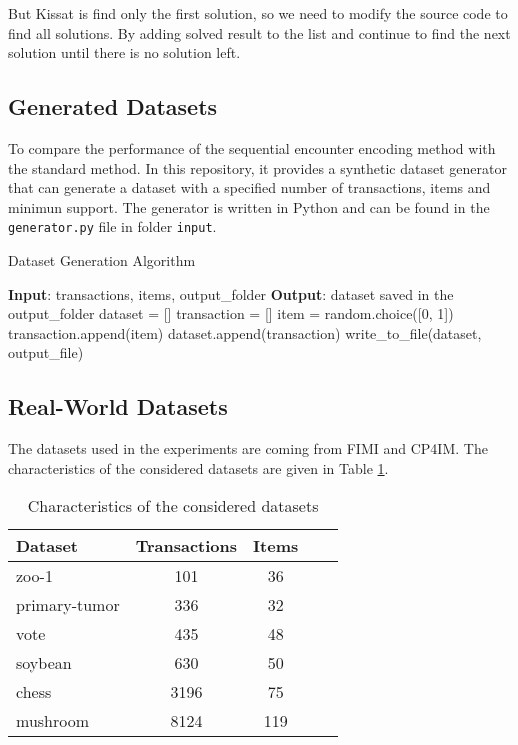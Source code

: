 But Kissat is find only the first solution, so we need to modify the source code to find all solutions.
By adding solved result to the list and continue to find the next solution until there is no solution left.

\subsection{Generated Datasets}
To compare the performance of the sequential encounter encoding method with the standard method.
In this repository, it provides a synthetic dataset generator that can generate a dataset with a specified number of transactions, items and minimun support.
The generator is written in Python and can be found in the \texttt{generator.py} file in folder \texttt{input}.

\begin{algorithm}
    \caption{Dataset Generation Algorithm}
    \begin{algorithmic}[1]
        \State \textbf{Input}: transactions, items, output\_folder
        \State \textbf{Output}: dataset saved in the output\_folder
        \State dataset = []
        \State transaction = []
        \State item = random.choice([0, 1])
        \State transaction.append(item)
        \EndFor
        \State dataset.append(transaction)
        \EndFor
        \State write\_to\_file(dataset, output\_file)
    \end{algorithmic}
\end{algorithm}

\subsection{Real-World Datasets}
The datasets used in the experiments are coming from FIMI\cite{fimi} and CP4IM\cite{cp4im}.
The characteristics of the considered datasets are given in Table \ref{tab:datasets}.
\begin{table}[H]
    \centering
    \caption{Characteristics of the considered datasets}
    \label{tab:datasets}
    \begin{tabular}{|l|c|c|c|c|}
        \hline
        Dataset       & Transactions & Items \\
        \hline
        zoo-1         & 101          & 36    \\
        primary-tumor & 336          & 32    \\
        vote          & 435          & 48    \\
        soybean       & 630          & 50    \\
        chess         & 3196         & 75    \\
        mushroom      & 8124         & 119   \\
        \hline
    \end{tabular}
\end{table}


